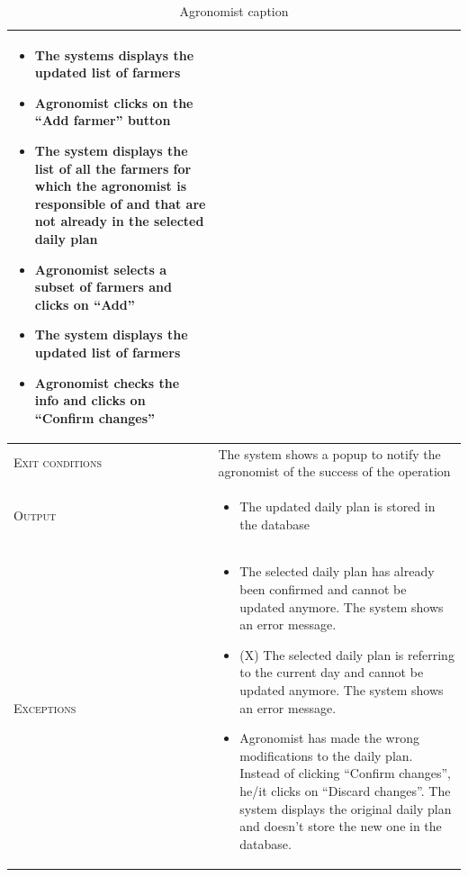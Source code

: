 \begin{table}[H]
\begin{tabular}[c]{|l|p{}|}
\begin{itemize}
                                            \item The systems displays the updated list of farmers
                                            \item Agronomist clicks on the “Add farmer” button
                                            \item The system displays the list of all the farmers for which the agronomist is responsible of and that are not already in the selected daily plan
                                            \item Agronomist selects a subset of farmers and clicks on “Add”
                                            \item The system displays the updated list of farmers
                                            \item Agronomist checks the info and clicks on “Confirm changes”

                                        \end{itemize}\\
        \hline %
        \textsc{Exit conditions}    &  The system shows a popup to notify the agronomist of the success of the operation
        \\
    	\hline %
    	\textsc{Output}             &  \begin{itemize}
    	    \item The updated daily plan is stored in the database
    	\end{itemize}\\
    	\hline %
    	\textsc{Exceptions}         &  \begin{itemize}
    	    \item The selected daily plan has already been confirmed and cannot be updated anymore. The system shows an error message.
    	    \item (X) The selected daily plan is referring to the current day and cannot be updated anymore. The system shows an error message.
    	    \item Agronomist has made the wrong modifications to the daily plan. Instead of clicking “Confirm changes”, he/it clicks on “Discard changes”. The system displays the original daily plan and doesn’t store the new one in the database.    	\end{itemize}\\
    	
    	\hline %
        
    \end{tabular}
    \caption{\label{tab:daily_plan_section_access}Agronomist caption }
\end{table}

